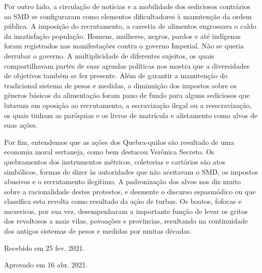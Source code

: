 \begin{refsection}
Por outro lado, a circulação de notícias e a mobilidade dos sediciosos contrários ao SMD se configuraram como elementos dificultadores à manutenção da ordem pública. A imposição do recrutamento, a carestia de alimentos engrossava o caldo da insatisfação população. Homens, mulheres, negros, pardos e até indígenas foram registrados nas manifestações contra o governo Imperial. Não se queria derrubar o governo. A multiplicidade de diferentes sujeitos, os quais compartilhavam partes de suas agendas políticas nos mostra que a diversidades de objetivos também se fez presente. Além de garantir a manutenção do tradicional sistema de pesos e medidas, a diminuição dos impostos sobre os gêneros básicos da alimentação foram pano de fundo para alguns sediciosos que lutavam em oposição ao recrutamento, a escravização ilegal ou a reescravização, os quais tinham as paróquias e os livros de matrícula e alistamento como alvos de suas ações. 

Por fim, entendemos que as ações dos Quebra-quilos são resultado de uma economia moral sertaneja, como bem destacou Verônica Secreto. Os quebramentos dos instrumentos métricos, coletorias e cartórios são atos simbólicos, formas de dizer às autoridades que não aceitavam o SMD, os impostos abusivos e o recrutamento ilegítimo. A padronização dos alvos nos diz muito sobre a racionalidade destes protestos, e desmente o discurso espasmódico ou que classifica esta revolta como resultado da ação de turbas. Os boatos, fofocas e mexericos, por sua vez, desempenharam a importante função de levar os gritos dos revoltosos a mais vilas, povoações e províncias, resultando na continuidade dos antigos sistemas de pesos e medidas por muitas décadas.

\printbibliography[heading=subbibliography,notcategory=fullcited]

\hfill Recebido em 25 fev. 2021.

\hfill Aprovado em 16 abr. 2021.

\label{chap:naoaopesoend}

\end{refsection}
